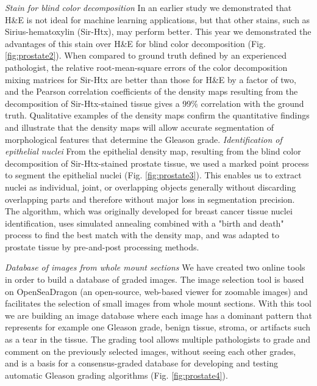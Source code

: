 \documentclass[10pt, a4paper]{article}
\begin{document}
\begin{enumerate}
{\textit{Stain for blind color decomposition} In an earlier study we demonstrated that H\&E is not ideal for machine learning applications, but that other stains, such as Sirius-hematoxylin (Sir-Htx), may perform better. This year we demonstrated the advantages of this stain over H\&E for blind color decomposition (Fig. \ref{fig:prostate2}). When compared to ground truth defined by an experienced pathologist, the relative root-mean-square errors of the color decomposition mixing matrices for Sir-Htx are better than those for H\&E by a factor of two, and the Pearson correlation coefficients of the density maps resulting from the decomposition of Sir-Htx-stained tissue gives a 99\% correlation with the ground truth. Qualitative examples of the density maps confirm the quantitative findings and illustrate that the density maps will allow accurate segmentation of morphological features that determine the Gleason grade.
\newpage
\textit{Identification of epithelial nuclei} From the epithelial density map, resulting from the blind color decomposition of Sir-Htx-stained prostate tissue, we used a marked point process to segment the epithelial nuclei (Fig. \ref{fig:prostate3}). This enables us to extract nuclei as individual, joint, or overlapping objects generally without discarding overlapping parts and therefore without major loss in segmentation precision. The algorithm, which was originally developed for breast cancer tissue nuclei identification, uses simulated annealing combined with a "birth and death" process to find the best match with the density map, and was adapted to prostate tissue by pre-and-post processing methods.

\textit{Database of images from whole mount sections} We have created two online tools in order to build a database of graded images. The image selection tool is based on OpenSeaDragon (an open-source, web-based viewer for zoomable images) and facilitates the selection of small images from whole mount sections. With this tool we are building an image database where each image has a dominant pattern that represents for example one Gleason grade, benign tissue, stroma, or artifacts such as a tear in the tissue. The grading tool allows multiple pathologists to grade and comment on the previously selected images, without seeing each other grades, and is a basis for a consensus-graded database for developing and testing automatic Gleason grading algorithms (Fig. \ref{fig:prostate4}).} 


\end{enumerate}
\end{document}
